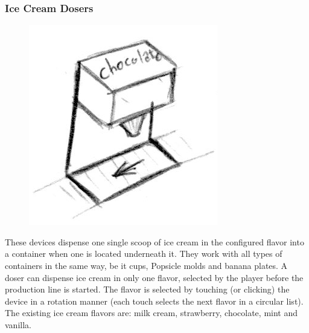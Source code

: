 \documentclass[a4paper]{scrartcl}
\begin{document}
        \subsubsection{Ice Cream Dosers}
            \begin{minipage}[t][7em][t]{\textwidth}
                \begin{figure}
                    \vspace{-20pt}
                    \includegraphics[scale=1]{devices/ice_cream_doser}
                    \vspace{-20pt}
                \end{figure}

                These devices dispense one single scoop of ice cream in the configured flavor into a container when one is located underneath it. They work with all types of containers in the same way, be it cups, Popsicle molds and banana plates. A doser can dispense ice cream in only one flavor, selected by the player before the production line is started. The flavor is selected by touching (or clicking) the device in a rotation manner (each touch selects the next flavor in a circular list).
                \\
                The existing ice cream flavors are: milk cream, strawberry, chocolate, mint and vanilla.
            \end{minipage}
\end{document}
